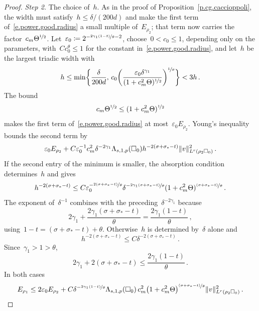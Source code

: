 \documentclass[11pt,letterpaper]{article}
\numberwithin{equation}{section}
\theoremstyle{definition}
\newcommand{\eps}{\varepsilon}
\newcommand{\nf}{\nicefrac}
\newcommand{\cu}{\square}
\DeclarePairedDelimiter{\norm}{\lVert}{\rVert}
\begin{document}
\begin{proof}
\emph{Step 2.} The choice of~$h$. As in the proof of Proposition~\ref{p.cg.caccioppoli}, the width must satisfy~$h\leq\delta/(200d)$ and make the first term of~\eqref{e.power.good.radius} a small multiple of~$E_{\rho_2}$; that term now carries the factor~$c_m\Theta^{\nf12}$. Let~$\eps_0\coloneqq2^{-\nf{2\gamma_1(1-t)}\theta-2}$, choose~$0<c_0\leq1$, depending only on the parameters, with~$Cc_0^\theta\leq1$ for the constant in~\eqref{e.power.good.radius}, and let~$h$ be the largest triadic width with
\begin{equation*}
	h\leq\min\biggl\{\frac{\delta}{200d},\,c_0\biggl(\frac{\eps_0\delta^{\gamma_1}}{(1+c_m^2\Theta)^{\nf12}}\biggr)^{\nf1\theta}\biggr\}<3h\,.
\end{equation*}
The bound
\begin{equation*}
	c_m\Theta^{\nf12}\leq(1+c_m^2\Theta)^{\nf12}
\end{equation*}
makes the first term of~\eqref{e.power.good.radius} at most~$\eps_0 E_{\rho_2}$. Young's inequality bounds the second term by
\begin{equation*}
	\eps_0 E_{\rho_2}+C\eps_0^{-1}c_m^2\delta^{-2\gamma_1}\Lambda_{s,1,p}(\cu_0)h^{-2(\sigma+\sigma_*-t)}\norm{v}_{L^r(\rho_2\cu_0)}^2\,.
\end{equation*} If the second entry of the minimum is smaller, the absorption condition determines~$h$ and gives
\begin{equation*}
	h^{-2(\sigma+\sigma_*-t)}\leq C\eps_0^{-\nf{2(\sigma+\sigma_*-t)}\theta}\delta^{-\nf{2\gamma_1(\sigma+\sigma_*-t)}\theta}(1+c_m^2\Theta)^{\nf{(\sigma+\sigma_*-t)}\theta}\,.
\end{equation*}
The exponent of~$\delta^{-1}$ combines with the preceding~$\delta^{-2\gamma_1}$ because
\begin{equation*}
	2\gamma_1+\frac{2\gamma_1(\sigma+\sigma_*-t)}\theta=\frac{2\gamma_1(1-t)}\theta\,,
\end{equation*}
using~$1-t=(\sigma+\sigma_*-t)+\theta$. Otherwise~$h$ is determined by~$\delta$ alone and
\begin{equation*}
	h^{-2(\sigma+\sigma_*-t)}\leq C\delta^{-2(\sigma+\sigma_*-t)}\,.
\end{equation*}
Since~$\gamma_1>1>\theta$,
\begin{equation*}
	2\gamma_1+2(\sigma+\sigma_*-t)\leq\frac{2\gamma_1(1-t)}\theta\,.
\end{equation*}
In both cases
\begin{equation}
	E_{\rho_1}\leq2\eps_0 E_{\rho_2}+C\delta^{-\nf{2\gamma_1(1-t)}\theta}\Lambda_{s,1,p}(\cu_0)\,c_m^2\bigl(1+c_m^2\Theta\bigr)^{\nf{(\sigma+\sigma_*-t)}\theta}\norm{v}_{L^r(\rho_2\cu_0)}^2\,.
	\label{e.power.eps}
\end{equation}


\end{proof}
\end{document}
